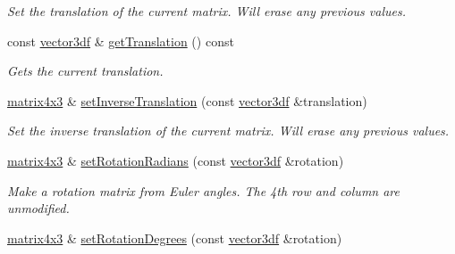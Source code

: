 \begin{DoxyCompactItemize}
\begin{DoxyCompactList}\small\item\em Set the translation of the current matrix. Will erase any previous values. \end{DoxyCompactList}\item 
const \hyperlink{namespaceirr_1_1core_a06f169d08b5c429f5575acb7edbad811}{vector3df} \& \hyperlink{classirr_1_1core_1_1matrix4x3_a72132bb97691a8b149b23c8ed8a93cf1}{get\+Translation} () const \hypertarget{classirr_1_1core_1_1matrix4x3_a72132bb97691a8b149b23c8ed8a93cf1}{}\label{classirr_1_1core_1_1matrix4x3_a72132bb97691a8b149b23c8ed8a93cf1}

\begin{DoxyCompactList}\small\item\em Gets the current translation. \end{DoxyCompactList}\item 
\hyperlink{classirr_1_1core_1_1matrix4x3}{matrix4x3} \& \hyperlink{classirr_1_1core_1_1matrix4x3_ad661ee4e99378c4e7e7c53b750fc4d8c}{set\+Inverse\+Translation} (const \hyperlink{namespaceirr_1_1core_a06f169d08b5c429f5575acb7edbad811}{vector3df} \&translation)\hypertarget{classirr_1_1core_1_1matrix4x3_ad661ee4e99378c4e7e7c53b750fc4d8c}{}\label{classirr_1_1core_1_1matrix4x3_ad661ee4e99378c4e7e7c53b750fc4d8c}

\begin{DoxyCompactList}\small\item\em Set the inverse translation of the current matrix. Will erase any previous values. \end{DoxyCompactList}\item 
\hyperlink{classirr_1_1core_1_1matrix4x3}{matrix4x3} \& \hyperlink{classirr_1_1core_1_1matrix4x3_af1bd04bd0554b6331b5db6b28104b964}{set\+Rotation\+Radians} (const \hyperlink{namespaceirr_1_1core_a06f169d08b5c429f5575acb7edbad811}{vector3df} \&rotation)\hypertarget{classirr_1_1core_1_1matrix4x3_af1bd04bd0554b6331b5db6b28104b964}{}\label{classirr_1_1core_1_1matrix4x3_af1bd04bd0554b6331b5db6b28104b964}

\begin{DoxyCompactList}\small\item\em Make a rotation matrix from Euler angles. The 4th row and column are unmodified. \end{DoxyCompactList}\item 
\hyperlink{classirr_1_1core_1_1matrix4x3}{matrix4x3} \& \hyperlink{classirr_1_1core_1_1matrix4x3_acd5b9dda4aea333f6eb196411b4ce997}{set\+Rotation\+Degrees} (const \hyperlink{namespaceirr_1_1core_a06f169d08b5c429f5575acb7edbad811}{vector3df} \&rotation)\hypertarget{classirr_1_1core_1_1matrix4x3_acd5b9dda4aea333f6eb196411b4ce997}{}\label{classirr_1_1core_1_1matrix4x3_acd5b9dda4aea333f6eb196411b4ce997}


\end{DoxyCompactItemize}
